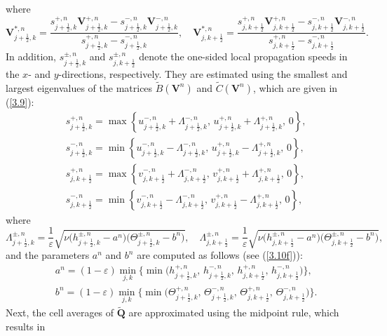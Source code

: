 \documentclass[a4paper,11pt,twoside]{article}
\numberwithin{equation}{section}
\numberwithin{figure}{section}
\numberwithin{table}{section}
\newcommand{\jR}{j+\frac{1}{2}}
\newcommand{\kR}{k+\frac{1}{2}}
\newcommand{\eps}{\varepsilon}
\newcommand{\bV}{\bm{V}}
\newcommand{\bQ}{\bm{Q}}
\newcommand\eref[1]{(\ref{#1})}
\begin{document}
where
\begin{equation*}		
\bV^{*,n}_{\jR,k}=\frac{s^{+,n}_{\jR,k}\bV^{+,n}_{\jR,k}-s^{-,n}_{\jR,k}\bV^{-,n}_{\jR,k}}{s^{+,n}_{\jR,k}-s^{-,n}_{\jR,k}},\quad
\bV^{*,n}_{j,\kR}=\frac{s^{+,n}_{j,\kR}\bV^{+,n}_{j,\kR}-s^{-,n}_{j,\kR}\bV^{-,n}_{j,\kR}}{s^{+,n}_{j,\kR}-s^{-,n}_{j,\kR}}.
\end{equation*}
In addition, $s_{\jR,k}^{\pm,n}$ and $s_{j,\kR}^{\pm,n}$ denote the one-sided local propagation speeds in the $x$- and $y$-directions, 
respectively. They are estimated using the smallest and largest eigenvalues of the matrices $\widetilde B(\bV^n)$ and $\widetilde C(\bV^n)$,
which are given in \eref{3.9}:
\begin{equation}
\begin{aligned}
&s^{+,n}_{\jR,k}=\max\left\{u^{-,n}_{\jR,k}+\Lambda^{-,n}_{\jR,k},\,u^{+,n}_{\jR,k}+\Lambda^{+,n}_{\jR,k},\,0\right\},\\
&s^{-,n}_{\jR,k}=\min\left\{u^{-,n}_{\jR,k}-\Lambda^{-,n}_{\jR,k},\,u^{+,n}_{\jR,k}-\Lambda^{+,n}_{\jR,k},\,0\right\},\\
&s^{+,n}_{j,\kR}=\max\left\{v^{-,n}_{j,\kR}+\Lambda^{-,n}_{j,\kR},\,v^{+,n}_{j,\kR}+\Lambda^{+,n}_{j,\kR},\,0\right\},\\
&s^{-,n}_{j,\kR}=\min\left\{v^{-,n}_{j,\kR}-\Lambda^{-,n}_{j,\kR},\,v^{+,n}_{j,\kR}-\Lambda^{+,n}_{j,\kR},\,0\right\},
\end{aligned}
\label{3.35f}
\end{equation}
where
\begin{equation}
\Lambda^{\pm,n}_{\jR,k}=\frac{1}{\eps}\sqrt{\nu\big(h^{\pm,n}_{\jR,k}-a^n\big)\big(\Theta^{\pm,n}_{\jR,k}-b^n\big)},\quad
\Lambda^{\pm,n}_{j,\kR}=\frac{1}{\eps}\sqrt{\nu\big(h^{\pm,n}_{j,\kR}-a^n\big)\big(\Theta^{\pm,n}_{j,\kR}-b^n\big)},
\label{3.35}
\end{equation}
and the parameters $a^n$ and $b^n$ are computed as follows (see \eref{3.10f}):
\begin{equation}
\begin{aligned}
&a^n=(1-\eps)\min\limits_{j,k}\Big\{\min\Big(h^{+,n}_{\jR,k},\,h^{-,n}_{\jR,k},\,h^{+,n}_{j,\kR},\,h^{-,n}_{j,\kR}\Big)\Big\},\\
&b^n=(1-\eps)\min\limits_{j,k}\Big\{\min\Big(\Theta^{+,n}_{\jR,k},\,\Theta^{-,n}_{\jR,k},\,\Theta^{+,n}_{j,\kR},\,\Theta^{-,n}_{j,\kR}\Big)
\Big\}.
\end{aligned}
\label{3.37}
\end{equation}
Next, the cell averages of $\widetilde{\bQ}$ are approximated using the midpoint rule, which results in 
\end{document}
